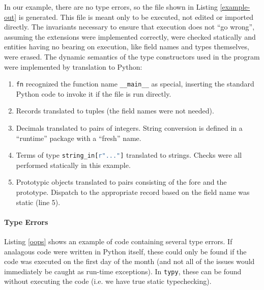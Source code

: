 \documentclass[preprint,10pt]{sigplanconf}
\newcommand{\lip}[1]{\lstinline[language=Python,basicstyle=\ttfamily\small,deletendkeywords={tuple,buffer,map}]{#1}}
\begin{document}
In our example, there are no type errors, so the file shown in Listing \ref{example-out}  is generated. This file is meant only to be executed, not edited or imported directly. The invariants necessary to ensure that execution does not ``go wrong'', assuming the extensions were implemented correctly, were checked statically and entities having no bearing on execution, like field names and types themselves, were erased. The dynamic semantics of the type constructors used in the program were implemented by translation to Python:%
\begin{enumerate}
\item \lip{fn} recognized the function name \lip{__main__} as special, inserting the standard Python code to invoke it if the file is run directly.
\item Records translated to tuples (the field names were not needed).
\item Decimals translated to pairs of integers. String conversion is defined in a ``runtime'' package with a ``fresh'' name.
\item Terms of type \lip{string_in[r"..."]} translated to strings. Checks were all performed  statically in this example.%
\item Prototypic objects translated to pairs consisting of the fore and the prototype. Dispatch to the appropriate record based on the field name was static (line 5).
\end{enumerate}


\paragraph{Type Errors} Listing \ref{oops} shows an example of code containing several type errors. If analagous code were written in Python itself, these could only be found if the code was executed on the first day of the month (and not all of the issues would  immediately be caught as run-time exceptions). In \texttt{typy}, these can be found without executing the code (i.e. we have true static typechecking).
\end{document}
